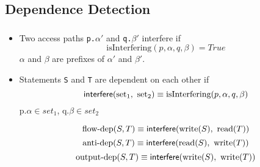 \documentclass{beamer}
\newcommand{\ttf}[1]{{\tt #1}}
\newcommand{\isInterfering}{\mbox{isInterfering}}
\newcommand{\interf}[2]{\mbox{\sf interfere}(#1,\ #2)}
\newcommand{\flowdep}{\mbox{flow-dep}}
\newcommand{\antidep}{\mbox{anti-dep}}
\newcommand{\outputdep}{\mbox{output-dep}}
\newcommand{\rs}[1]{\mbox{read}(#1)}
\newcommand{\ws}[1]{\mbox{write}(#1)}
\newcommand{\set}{\mbox{set}}
\begin{document}
\subsection{Dependence Detection}
\frame
{
	\frametitle{\subsecname}
	\begin{itemize}
	\item Two access paths \ttf{p.$\alpha'$} and \ttf{q.$\beta'$} interfere if 
	\[\isInterfering(p, \alpha, q, \beta) = True\]	
	 $\alpha$ and $\beta$ are prefixes of $\alpha'$ and $\beta'$.
	 \pause
	\item Statements \ttf{S} and \ttf{T} are dependent on each other if 
\[\interf{\set_1}{\set_2} \equiv \isInterfering(p, \alpha, q,
\beta)\]
p.$\alpha\in{set_1}$, q.$\beta\in{set_2}$
\pause
\begin{framed}
\[\flowdep(S, T) \equiv \interf{\ws{S}}{\rs{T}} \]
\[\antidep(S, T) \equiv \interf{\rs{S}}{\ws{T}} \]
\[\outputdep(S, T) \equiv \interf{\ws{S}}{\ws{T}} \]
\end{framed}
\end{itemize}
}
\end{document}
